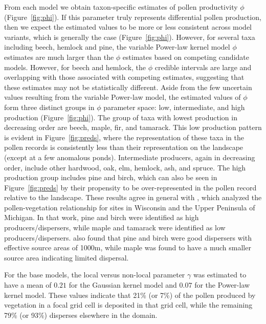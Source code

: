 \documentclass[12pt]{article}
\begin{document}
From each model we obtain taxon-specific estimates of pollen
productivity $\phi$ (Figure~\ref{fig:phi}). If this parameter truly
represents differential pollen production, then we expect the
estimated values to be more or less consistent across model variants,
which is generally the case (Figure~\ref{fig:phi}). However, for
several taxa including beech, hemlock and pine, the variable Power-law
kernel model $\phi$ estimates are much larger than the $\phi$
estimates based on competing candidate models. However, for beech and
hemlock, the $\phi$ credible intervals are large and overlapping with
those associated with competing estimates, suggesting that these
estimates may not be statistically different. Aside from the few
uncertain values resulting from the variable Power-law model, the
estimated values of $\phi$ form three distinct groups in $\phi$
parameter space: low, intermediate, and high production
(Figure~\ref{fig:phi}). The group of taxa with lowest production in
decreasing order are beech, maple, fir, and tamarack. This
low production pattern is evident in Figure~\ref{fig:preds}, where the
representation of these taxa in the pollen records is consistently
less than their representation on the landscape (except at a few
anomalous ponds). Intermediate producers, again in decreasing order,
include other hardwood, oak, elm, hemlock, ash, and spruce. The high
production group includes pine and birch, which can also be seen in
Figure~\ref{fig:preds} by their propensity to be over-represented in
the pollen record relative to the landscape. These results agree in
general with \citep{prentice1986}, which analyzed the
pollen-vegetation relationship for sites in Wisconsin and the Upper
Peninsula of Michigan. In that work, pine and birch were identified as
high producers/dispersers, while maple and tamarack were identified as
low producers/dispersers. \citep{jackson1990} also found that pine and
birch were good dispersers with effective source areas of 1000m, while
maple was found to have a much smaller source area indicating limited
dispersal.

For the base models, the local versus non-local parameter $\gamma$ was
estimated to have a mean of $0.21$ for the Gaussian kernel model and
$0.07$ for the Power-law kernel model. These values indicate that 21\%
(or 7\%) of the pollen produced by vegetation in a focal grid cell is
deposited in that grid cell, while the remaining 79\% (or 93\%)
disperses elsewhere in the domain.
\end{document}
